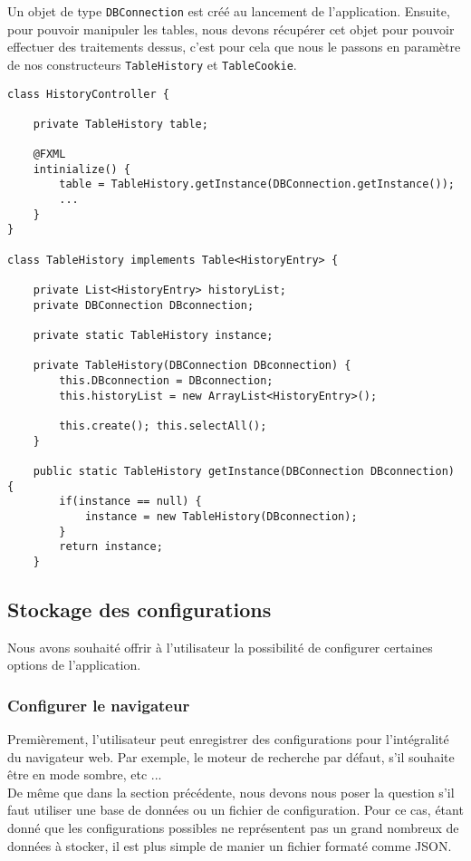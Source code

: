 \documentclass[10pt,a4paper]{article}
\begin{document}
Un objet de type \verb|DBConnection| est créé au lancement de l'application. Ensuite, pour pouvoir manipuler les tables, nous devons récupérer cet objet pour pouvoir effectuer des traitements dessus, c'est pour cela que nous le passons en paramètre de nos constructeurs \verb|TableHistory| et \verb|TableCookie|. \\

\newpage

\begin{lstlisting}
class HistoryController {

	private TableHistory table;    
    
    @FXML
    intinialize() {
        table = TableHistory.getInstance(DBConnection.getInstance());
        ...
    }
}

class TableHistory implements Table<HistoryEntry> {

	private List<HistoryEntry> historyList;
	private DBConnection DBconnection;

	private static TableHistory instance;
	
	private TableHistory(DBConnection DBconnection) {
		this.DBconnection = DBconnection;
		this.historyList = new ArrayList<HistoryEntry>();
		
		this.create(); this.selectAll();
	}
	
	public static TableHistory getInstance(DBConnection DBconnection) {
		if(instance == null) {
			instance = new TableHistory(DBconnection);
		}
		return instance;
	}
\end{lstlisting}




\newpage

\subsection{Stockage des configurations}
Nous avons souhaité offrir à l'utilisateur la possibilité de configurer certaines options de l'application. 

\subsubsection{Configurer le navigateur}
Premièrement, l'utilisateur peut enregistrer des configurations pour l'intégralité du navigateur web. Par exemple, le moteur de recherche par défaut, s'il souhaite être en mode sombre, etc ... \\
De même que dans la section précédente, nous devons nous poser la question s'il faut utiliser une base de données ou un fichier de configuration. Pour ce cas, étant donné que les configurations possibles ne représentent pas un grand nombreux de données à stocker, il est plus simple de manier un fichier formaté comme JSON.
\end{document}

